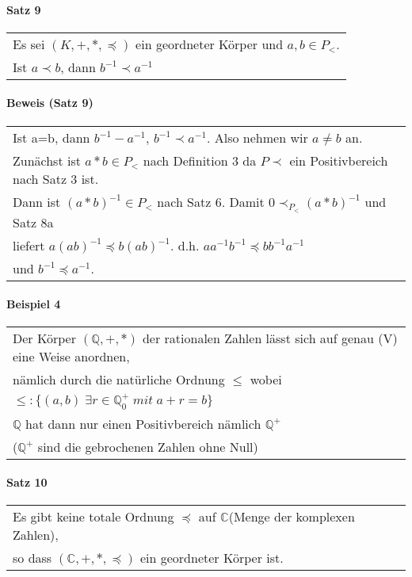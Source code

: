 \documentclass[a4paper]{scrartcl}
\begin{document}
\paragraph{Satz 9}
\begin{tabbing}
\begin{tabular}{l}
Es sei $(K,+,*,\preceq)$ ein geordneter Körper und $a,b\in P_<$.\\
Ist $a\prec b$, dann $b^{-1} \prec a^{-1}$
\end{tabular}
\end{tabbing}

\paragraph{Beweis (Satz 9)}
\begin{tabbing}
\begin{tabular}{l}
Ist a=b, dann $b^{-1}-a^{-1}$, $b^{-1} \prec a^{-1}$. Also nehmen wir $a \neq b$ an.\\
Zunächst ist $a*b\in P_<$ nach Definition 3 da $P\prec$ ein Positivbereich nach Satz 3 ist.\\
Dann ist $(a*b)^{-1}\in P_<$ nach Satz 6. Damit $0 \prec_{P_<} (a*b)^{-1}$ und Satz 8a\\
liefert $a(ab)^{-1} \preceq b(ab)^{-1}$. d.h. $aa^{-1}b^{-1} \preceq bb^{-1}a^{-1}$\\
und $b^{-1} \preceq a^{-1}$.
\end{tabular}
\end{tabbing}

\paragraph{Beispiel 4}
\begin{tabbing}
\begin{tabular}{l}
Der Körper $(\mathbb{Q},+,*)$ der rationalen Zahlen lässt sich auf genau (V) eine Weise anordnen,\\
nämlich durch die natürliche Ordnung $\leq$ wobei\\
$\leq : \{(a,b)\;\exists r\in\mathbb{Q}^+_0\;mit\;a+r=b\}$ \\
$\mathbb{Q}$ hat dann nur einen Positivbereich nämlich $\mathbb{Q}^+$\\
($\mathbb{Q}^+$ sind die gebrochenen Zahlen ohne Null)
\end{tabular}
\end{tabbing}

\paragraph{Satz 10}
\begin{tabbing}
\begin{tabular}{l}
Es gibt keine totale Ordnung $\preceq$ auf $\mathbb{C}$(Menge der komplexen Zahlen),\\
so dass $(\mathbb{C},+,*,\preceq)$ ein geordneter Körper ist.
\end{tabular}
\end{tabbing}
\end{document}
